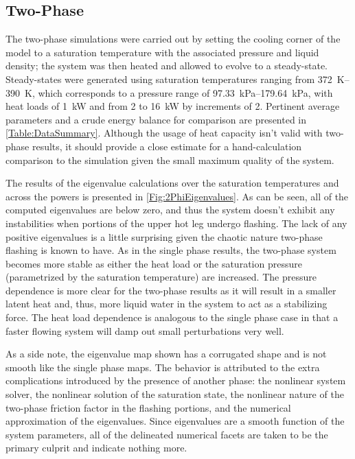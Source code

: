 \subsection{Two-Phase}

The two-phase simulations were carried out by setting the cooling corner of the model to a saturation temperature with the associated pressure and liquid density; the system was then heated and allowed to evolve to a steady-state.
Steady-states were generated using saturation temperatures ranging from \SIrange{372}{390}{\kelvin}, which corresponds to a pressure range of \SIrange{97.33}{179.64}{\kilo\pascal}, with heat loads of \SI{1}{\kW} and from \num{2} to \SI{16}{\kW} by increments of \num{2}.
Pertinent average parameters and a crude energy balance for comparison are presented in \cref{Table:DataSummary}.
Although the usage of heat capacity isn't valid with two-phase results, it should provide a close estimate for a hand-calculation comparison to the simulation given the small maximum quality of the system.


The results of the eigenvalue calculations over the saturation temperatures and across the powers is presented in \cref{Fig:2PhiEigenvalues}.
As can be seen, all of the computed eigenvalues are below zero, and thus the system doesn't exhibit any instabilities when portions of the upper hot leg undergo flashing.
The lack of any positive eigenvalues is a little surprising given the chaotic nature two-phase flashing is known to have.
As in the single phase results, the two-phase system becomes more stable as either the heat load or the saturation pressure (parametrized by the saturation temperature) are increased.
The pressure dependence is more clear for the two-phase results as it will result in a smaller latent heat and, thus, more liquid water in the system to act as a stabilizing force.
The heat load dependence is analogous to the single phase case in that a faster flowing system will damp out small perturbations very well.

As a side note, the eigenvalue map shown has a corrugated shape and is not smooth like the single phase maps.
The behavior is attributed to the extra complications introduced by the presence of another phase: the nonlinear system solver, the nonlinear solution of the saturation state, the nonlinear nature of the two-phase friction factor in the flashing portions, and the numerical approximation of the eigenvalues.
Since eigenvalues are a smooth function of the system parameters, all of the delineated numerical facets are taken to be the primary culprit and indicate nothing more.


